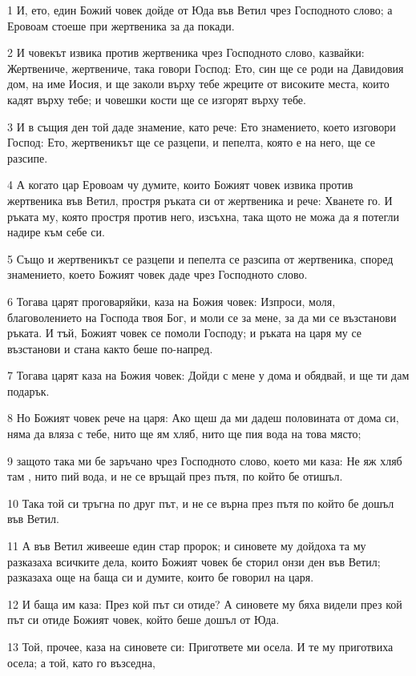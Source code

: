 \par 1 И, ето, един Божий човек дойде от Юда във Ветил чрез Господното слово; а Еровоам стоеше при жертвеника за да покади.
\par 2 И човекът извика против жертвеника чрез Господното слово, казвайки: Жертвениче, жертвениче, така говори Господ: Ето, син ще се роди на Давидовия дом, на име Иосия, и ще заколи върху тебе жреците от високите места, които кадят върху тебе; и човешки кости ще се изгорят върху тебе.
\par 3 И в същия ден той даде знамение, като рече: Ето знамението, което изговори Господ: Ето, жертвеникът ще се разцепи, и пепелта, която е на него, ще се разсипе.
\par 4 А когато цар Еровоам чу думите, които Божият човек извика против жертвеника във Ветил, простря ръката си от жертвеника и рече: Хванете го. И ръката му, която простря против него, изсъхна, така щото не можа да я потегли надире към себе си.
\par 5 Също и жертвеникът се разцепи и пепелта се разсипа от жертвеника, според знамението, което Божият човек даде чрез Господното слово.
\par 6 Тогава царят проговаряйки, каза на Божия човек: Изпроси, моля, благоволението на Господа твоя Бог, и моли се за мене, за да ми се възстанови ръката. И тъй, Божият човек се помоли Господу; и ръката на царя му се възстанови и стана както беше по-напред.
\par 7 Тогава царят каза на Божия човек: Дойди с мене у дома и обядвай, и ще ти дам подарък.
\par 8 Но Божият човек рече на царя: Ако щеш да ми дадеш половината от дома си, няма да вляза с тебе, нито ще ям хляб, нито ще пия вода на това място;
\par 9 защото така ми бе заръчано чрез Господното слово, което ми каза: Не яж хляб там , нито пий вода, и не се връщай през пътя, по който бе отишъл.
\par 10 Така той си тръгна по друг път, и не се върна през пътя по който бе дошъл във Ветил.
\par 11 А във Ветил живееше един стар пророк; и синовете му дойдоха та му разказаха всичките дела, които Божият човек бе сторил онзи ден във Ветил; разказаха още на баща си и думите, които бе говорил на царя.
\par 12 И баща им каза: През кой път си отиде? А синовете му бяха видели през кой път си отиде Божият човек, който беше дошъл от Юда.
\par 13 Той, прочее, каза на синовете си: Пригответе ми осела. И те му приготвиха осела; а той, като го възседна,

